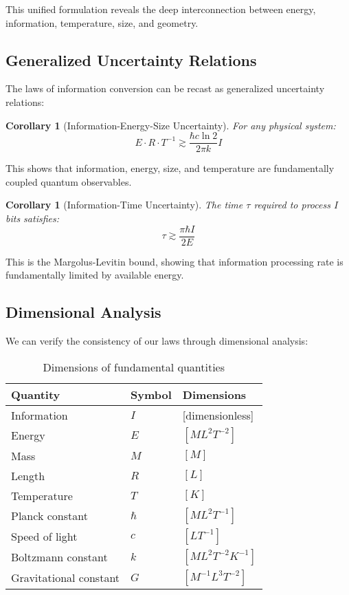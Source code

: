 \documentclass[11pt,a4paper]{article}
\theoremstyle{plain}
\newtheorem{corollary}[theorem]{Corollary}
\theoremstyle{definition}
\theoremstyle{remark}
\begin{document}
This unified formulation reveals the deep interconnection between energy, information, temperature, size, and geometry.

\subsection{Generalized Uncertainty Relations}

The laws of information conversion can be recast as generalized uncertainty relations:

\begin{corollary}[Information-Energy-Size Uncertainty]
For any physical system:
\begin{equation}
E \cdot R \cdot T^{-1} \gtrsim \frac{\hbar c\ln 2}{2\pi k}I
\end{equation}
\end{corollary}

This shows that information, energy, size, and temperature are fundamentally coupled quantum observables.

\begin{corollary}[Information-Time Uncertainty]
The time $\tau$ required to process $I$ bits satisfies:
\begin{equation}
\tau \gtrsim \frac{\pi\hbar I}{2E}
\end{equation}
\end{corollary}

This is the Margolus-Levitin bound, showing that information processing rate is fundamentally limited by available energy.

\subsection{Dimensional Analysis}

We can verify the consistency of our laws through dimensional analysis:

\begin{table}[h]
\centering
\begin{tabular}{lll}
\hline
Quantity & Symbol & Dimensions \\
\hline
Information & $I$ & [dimensionless] \\
Energy & $E$ & $[M L^2 T^{-2}]$ \\
Mass & $M$ & $[M]$ \\
Length & $R$ & $[L]$ \\
Temperature & $T$ & $[K]$ \\
Planck constant & $\hbar$ & $[M L^2 T^{-1}]$ \\
Speed of light & $c$ & $[L T^{-1}]$ \\
Boltzmann constant & $k$ & $[M L^2 T^{-2} K^{-1}]$ \\
Gravitational constant & $G$ & $[M^{-1} L^3 T^{-2}]$ \\
\hline
\end{tabular}
\caption{Dimensions of fundamental quantities}
\end{table}
\end{document}
